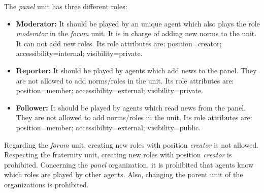 The \textit{panel} unit has three different roles:
\begin{itemize}
\item \textbf{Moderator:} It should be played by an unique agent which also plays the role \textit{moderator} in the \textit{forum} unit. It is in charge of adding new norms to the unit. It can not add new roles. Its role attributes are: position=creator; accessibility=internal; visibility=private.
\item \textbf{Reporter:} It should be played by agents which add news to the panel. They are not allowed to add norms/roles in the unit. Its role attributes are: position=member; accessibility=external; visibility=private.
\item \textbf{Follower:} It should be played by agents which read news from the panel.  They are not allowed to add norms/roles in the unit. Its role attributes are: position=member; accessibility=external; visibility=public.
\end{itemize}

Regarding the \textit{forum} unit, creating new roles with position \textit{creator} is not allowed.  Respecting the fraternity unit, creating new roles with position \textit{creator} is prohibited. Concerning the \textit{panel} organization, it is prohibited that agents know which roles are played by other agents. Also, changing the parent unit of the organizations is prohibited.   

